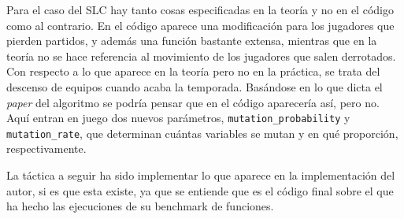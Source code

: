 Para el caso del SLC hay tanto cosas especificadas en la teoría y no en el código como al contrario. En el código aparece una modificación para los jugadores que pierden partidos, y además una función bastante extensa, mientras que en la teoría no se hace referencia al movimiento de los jugadores que salen derrotados. Con respecto a lo que aparece en la teoría pero no en la práctica, se trata del descenso de equipos cuando acaba la temporada. Basándose en lo que dicta el \textit{paper} del algoritmo se podría pensar que en el código aparecería así, pero no. Aquí entran en juego dos nuevos parámetros, \texttt{mutation\_probability} y \texttt{mutation\_rate}, que determinan cuántas variables se mutan y en qué proporción, respectivamente.

La táctica a seguir ha sido implementar lo que aparece en la implementación del autor, si es que esta existe, ya que se entiende que es el código final sobre el que ha hecho las ejecuciones de su benchmark de funciones.